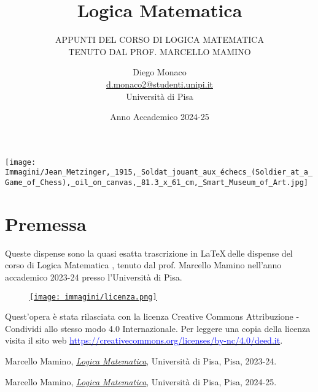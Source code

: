 \documentclass[11pt,headheight=35pt]{scrartcl}
\begin{document}
\title{Logica Matematica}
\subtitle{\large\normalfont\rmfamily\scshape APPUNTI DEL CORSO DI LOGICA MATEMATICA \\ TENUTO DAL PROF. MARCELLO MAMINO}
\author{Diego Monaco \\ \textnormal{\href{d.monaco2@studenti.unipi.it}{d.monaco2@studenti.unipi.it}} \\ Università di Pisa}
\date{Anno Accademico 2024-25}
\maketitle
\begin{center}
    \texttt{[image: Immagini/Jean\_Metzinger,\_1915,\_Soldat\_jouant\_aux\_échecs\_(Soldier\_at\_a\_Game\_of\_Chess),\_oil\_on\_canvas,\_81.3\_x\_61\_cm,\_Smart\_Museum\_of\_Art.jpg]}
\end{center}
\newpage

\tableofcontents
\newpage

\section*{Premessa}
Queste dispense sono la quasi esatta trascrizione in \LaTeX\,delle dispense del corso di Logica Matematica \cite{mamino_logica_23_24}, tenuto dal prof. Marcello Mamino nell'anno accademico 2023-24 presso l'Università di Pisa.

\vfill
\begin{wrapfigure}{R}{0.2\textwidth}
	\href{https://creativecommons.org/licenses/by-nc/4.0/deed.it}{\texttt{[image: immagini/licenza.png]}}
\end{wrapfigure}
Quest'opera è stata rilasciata con la licenza Creative Commons Attribuzione - Condividi allo stesso modo 4.0 Internazionale.
Per leggere una copia della licenza visita il sito web \href{http://creativecommons.org/licenses/by-sa/4.0/deed.it}{\textcolor{blue}{https://creativecommons.org/licenses/by-nc/4.0/deed.it}}.

\newpage





\begin{thebibliography}{9}
	Marcello Mamino,
	\href{https://ciovil.li/logica23/}{\textit{Logica Matematica}},
	Università di Pisa, Pisa,
	2023-24.

	Marcello Mamino,
	\href{https://ciovil.li/logica24/}{\textit{Logica Matematica}},
	Università di Pisa, Pisa,
	2024-25.
\end{thebibliography}
\end{document}
